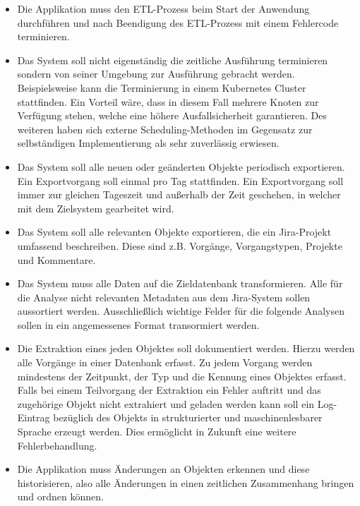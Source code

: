 \begin{itemize}
  \item Die Applikation muss den ETL-Prozess beim Start der Anwendung durchführen und nach Beendigung des ETL-Prozess mit einem Fehlercode terminieren.
  \item Das System soll nicht eigenständig die zeitliche Ausführung terminieren sondern von seiner Umgebung zur Ausführung gebracht werden. Beispielsweise kann die Terminierung in einem Kubernetes Cluster stattfinden. Ein Vorteil wäre, dass in diesem Fall mehrere Knoten zur Verfügung stehen, welche eine höhere Ausfallsicherheit garantieren. Des weiteren haben sich externe Scheduling-Methoden im Gegensatz zur selbständigen Implementierung als sehr zuverlässig erwiesen. \\
  \item Das System soll alle neuen oder geänderten Objekte periodisch exportieren. Ein Exportvorgang soll einmal pro Tag stattfinden. Ein Exportvorgang soll immer zur gleichen Tageszeit und außerhalb der Zeit geschehen, in welcher mit dem Zielsystem gearbeitet wird.
  \item Das System soll alle relevanten Objekte exportieren, die ein Jira-Projekt umfassend beschreiben. Diese sind z.B. Vorgänge, Vorgangstypen, Projekte und Kommentare.
  \item Das System muss alle Daten auf die Zieldatenbank transformieren. Alle für die Analyse nicht relevanten Metadaten aus dem Jira-System sollen aussortiert werden. Ausschließlich wichtige Felder für die folgende Analysen sollen in ein angemessenes Format transormiert werden.
  \item Die Extraktion eines jeden Objektes soll dokumentiert werden. Hierzu werden alle Vorgänge in einer Datenbank erfasst. Zu jedem Vorgang werden mindestens der Zeitpunkt, der Typ und die Kennung eines Objektes erfasst.\\
  Falls bei einem Teilvorgang der Extraktion ein Fehler auftritt und das zugehörige Objekt nicht extrahiert und geladen werden kann soll ein Log-Eintrag bezüglich des Objekts in strukturierter und maschinenlesbarer Sprache erzeugt werden. Dies ermöglicht in Zukunft eine weitere Fehlerbehandlung.
  \item Die Applikation muss Änderungen an Objekten erkennen und diese historisieren, also alle Änderungen in einen zeitlichen Zusammenhang bringen und ordnen können.
\end{itemize}

